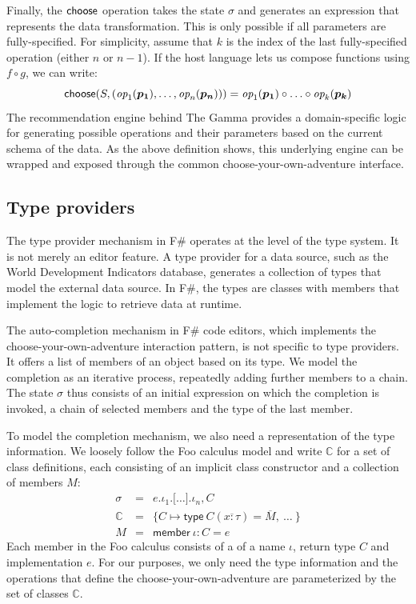 \documentclass[ a4paper,UKenglish,cleveref, autoref, thm-restate]{lipics-v2021}
\newcommand{\ident}[1]{\textsf{#1}}
\newcommand{\select}{\textnormal{\ident{choose}}}
\newcommand{\op}{\textit{op}}
\begin{document}
Finally, the $\select$ operation takes the state $\sigma$ and generates an expression that represents
the data transformation. This is only possible if all parameters are fully-specified. For simplicity,
assume that $k$ is the index of the last fully-specified operation (either $n$ or $n-1$). If the
host language lets us compose functions using $f\circ g$, we can write:
\[
\select(S, (\op_1(\boldsymbol{p_1}), \ldots, \op_n(\boldsymbol{p_n}))) = \op_1(\boldsymbol{p_1}) \circ \ldots \circ \op_k(\boldsymbol{p_k})
\]
The recommendation engine behind The Gamma provides a domain-specific logic for generating
possible operations and their parameters based on the current schema of the data. As the above
definition shows, this underlying engine can be wrapped and exposed through the common
choose-your-own-adventure interface.


\subsection{Type providers}
\label{sec:examples-tps}

The type provider mechanism in F\# operates at the level of the type system. It is not merely an
editor feature. A type provider for a data source, such as the World Development Indicators database,
generates a collection of types that model the external data source. In F\#, the types are classes
with members that implement the logic to retrieve data at runtime.

The auto-completion mechanism in F\# code editors, which implements the choose-your-own-adventure
interaction pattern, is not specific to type providers. It offers a list of members of an object
based on its type. We model the completion as an iterative process, repeatedly adding further
members to a chain. The state $\sigma$ thus consists of an initial expression on which the
completion is invoked, a chain of selected members and the type of the last member.

To model the completion mechanism, we also need a representation of the type information. We loosely
follow the Foo calculus model \cite{petricek-2016-fsdata} and write $\mathbb{C}$ for a set
of class definitions, each consisting of an implicit class constructor and a collection of
members $M$:
\[
\begin{array}{rcl}
\sigma &=& e . \iota_1 . \lbrack\ldots\rbrack . \iota_n, C\\
\mathbb{C} &=& \{ C \mapsto \ident{type}~C(\overline{x:\tau}) = \overline{M},~\ldots~ \}\\
M &=& \ident{member}~\iota\!:\!C=e
\end{array}
\]
Each member in the Foo calculus consists of a of a name $\iota$, return type $C$ and implementation
$e$. For our purposes, we only need the type information and the operations that define the
choose-your-own-adventure are parameterized by the set of classes $\mathbb{C}$.
\end{document}
